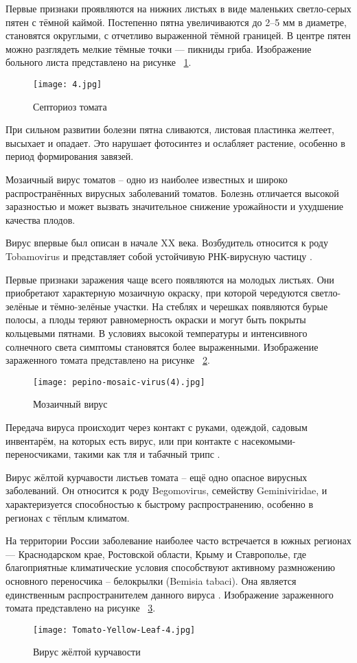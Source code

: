 Первые признаки проявляются на нижних листьях в виде маленьких светло-серых пятен с тёмной каймой. Постепенно пятна увеличиваются до 2–5 мм в диаметре, становятся округлыми, с отчетливо выраженной тёмной границей. В центре пятен можно разглядеть мелкие тёмные точки — пикниды гриба. Изображение больного листа представлено на рисунке ~\ref{templ:image4}.

\begin{figure}[h]
	\texttt{[image: 4.jpg]}
	\caption{Септориоз томата}
	\label{templ:image4}
\end{figure}

При сильном развитии болезни пятна сливаются, листовая пластинка желтеет, высыхает и опадает. Это нарушает фотосинтез и ослабляет растение, особенно в период формирования завязей.

Мозаичный вирус томатов -- одно из наиболее известных и широко распространённых вирусных заболеваний томатов. Болезнь отличается высокой заразностью и может вызвать значительное снижение урожайности и ухудшение качества плодов.

Вирус впервые был описан в начале XX века. Возбудитель относится к роду Tobamovirus и представляет собой устойчивую РНК-вирусную частицу \cite{plant19}.

Первые признаки заражения чаще всего появляются на молодых листьях. Они приобретают характерную мозаичную окраску, при которой чередуются светло-зелёные и тёмно-зелёные участки. На стеблях и черешках появляются бурые полосы, а плоды теряют равномерность окраски и могут быть покрыты кольцевыми пятнами. В условиях высокой температуры и интенсивного солнечного света симптомы становятся более выраженными. Изображение зараженного томата представлено на рисунке ~\ref{templ:image5}.
\begin{figure}[h]
	\texttt{[image: pepino-mosaic-virus(4).jpg]}
	\caption{Мозаичный вирус}
	\label{templ:image5}
\end{figure}

Передача вируса происходит через контакт с руками, одеждой, садовым инвентарём, на которых есть вирус, или при контакте с насекомыми-переносчиками, такими как тля и табачный трипс \cite{plant5}.

Вирус жёлтой курчавости листьев томата -- ещё одно опасное вирусных заболеваний. Он относится к роду Begomovirus, семейству Geminiviridae, и характеризуется способностью к быстрому распространению, особенно в регионах с тёплым климатом.

На территории России заболевание наиболее часто встречается в южных регионах — Краснодарском крае, Ростовской области, Крыму и Ставрополье, где благоприятные климатические условия способствуют активному размножению основного переносчика -- белокрылки (Bemisia tabaci). Она является единственным распространителем данного вируса \cite{plant13}. Изображение зараженного томата представлено на рисунке ~\ref{templ:image6}.
\begin{figure}[h]
	\texttt{[image: Tomato-Yellow-Leaf-4.jpg]}
	\caption{Вирус жёлтой курчавости}
	\label{templ:image6}
\end{figure}


